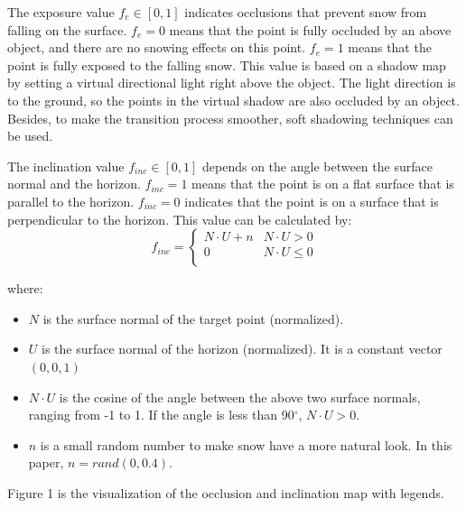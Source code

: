 \documentclass{article}
\begin{document}
The exposure value \( f_{e} \in [0, 1] \) indicates occlusions that prevent snow from falling on the surface. \( f_{e}=0 \) means that 
the point is fully occluded by an above object, and there are no snowing effects on this point. \( f_{e}=1 \) means that the point is 
fully exposed to the falling snow. This value is based on a shadow map by setting a virtual directional light right above the object. 
The light direction is to the ground, so the points in the virtual shadow are also occluded by an object. Besides, to make the 
transition process smoother, soft shadowing techniques can be used. 

The inclination value \( f_{inc} \in [0, 1] \) depends on the angle between the surface normal and the horizon. \( f_{inc}=1 \) means 
that the point is on a flat surface that is parallel to the horizon. \( f_{inc}=0 \) indicates that the point is on a surface that is 
perpendicular to the horizon. This value can be calculated by:
\[
  f_{inc}=
  \left\{
    \begin{array}{ll}
      N \cdot U + n & N \cdot U > 0 \\
      0 & N \cdot U \leq 0 \\
    \end{array} 
  \right. 
\]

where:
\begin{itemize}
  \item \( N \) is the surface normal of the target point (normalized).
  \item \( U \) is the surface normal of the horizon (normalized). It is a constant vector \((0, 0, 1)\)
  \item \( N \cdot U \) is the cosine of the angle between the above two surface normals, ranging from -1 to 1. If the angle is less 
  than 90$^{\circ}$, \( N \cdot U > 0\).
  \item \( n \) is a small random number to make snow have a more natural look. In this paper, \(n = rand(0, 0.4)\).
\end{itemize}

Figure 1 is the visualization of the occlusion and inclination map with legends. 
\end{document}
